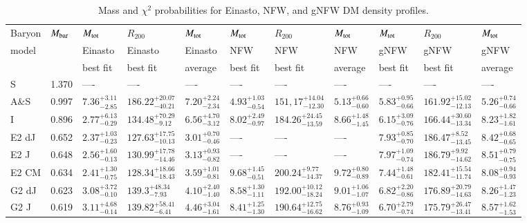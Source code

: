 \documentclass{aa}
\begin{document}
\begin{table*}
        \centering
        \caption{Mass and $\chi^2$ probabilities for Einasto, NFW, and gNFW DM density profiles.}
        \label{tab:estimated_mass}
\begin{tabular}{lllllllllll}
\hline\hline
Baryon  & $M_{\rm bar}$ & $M_{\rm tot}$ & $R_{200}$  &  $M_{\rm tot}$ & $M_{\rm tot}$ & $R_{200}$ & $M_{\rm tot}$ & $M_{\rm tot}$  & $R_{200}$ & $M_{\rm tot}$ \\
model &  &  Einasto & Einasto &  Einasto & NFW & NFW & NFW & gNFW & gNFW & gNFW  \\
 & & best fit & best fit & average & best fit & best fit & average & best fit & best fit & average \\
\hline
S & 1.370 & ---- & ---- & ---- & ---- & ---- & ---- & ---- & ---- & ---- \\
A\&S & 0.997 & $ 7.36^{+3.11}_{-2.85}$ & $186.22^{+20.07}_{-40.21}$ & $ 7.20^{+2.24}_{-2.34}$ & $4.93^{+1.03}_{-0.54}$ & $151,17^{+14.04}_{-12.30}$ & $5.13^{+0.66}_{-0.60}$ & $5.83^{+0.95}_{-0.66}$ & $161.92^{+15.02}_{-12.13}$ & $5.26^{+0.74}_{-0.66}$\\
I & 0.896 & $2.77^{+6.13}_{-0.29}$ & $134.48^{+70.29}_{-9.12}$ & $6.56^{+4.70}_{-3.12}$ & $8.02^{+2.49}_{-0.97}$ & $184.26^{+24.45}_{-13.59}$ & $8.66^{+1.48}_{-1.45}$ & $6.15^{+3.09}_{-0.76}$ & $166.44^{+30.60}_{-13.34}$ & $8.23^{+1.82}_{-1.61}$\\
E2 dJ & 0.652 & $2.37^{+1.03}_{-0.23}$ & $127.63^{+17.75}_{-10.13}$ & $3.01^{+0.70}_{-0.46}$ & ---- & ---- &---- & $7.93^{+0.85}_{-0.70}$ & $186.47^{+8.52}_{-13.45}$ & $8.42^{+0.68}_{-0.65}$\\
E2 J & 0.648 & $2.56^{+1.60}_{-0.13}$ & $130.99^{+17.78}_{-14.46}$ & $3.13^{+0.93}_{-0.82}$ & ---- & ---- & ---- & $7.97^{+1.09}_{-0.74}$ & $186.79^{+9.92}_{-14.62}$ & $8.51^{+0.79}_{-0.75}$\\
E2 CM & 0.634 & $2.41^{+1.30}_{-0.75}$ & $128.34^{+18.66}_{-18.43}$ & $3.59^{+1.01}_{-0.81}$  & $9.68^{+1.45}_{-0.51}$ & $200.24^{+9.77}_{-14.37}$ & $9.72^{+0.80}_{-0.89}$& $7.44^{+1.48}_{-0.61}$ & $182.41^{+15.54}_{-11.74}$ & $8.08^{+0.94}_{-0.93}$\\
G2 dJ & 0.623 & $3.08^{+3.72}_{-0.10}$ & $139.3^{+48.34}_{-7.93}$ & $4.10^{+2.40}_{-1.40}$ & $8.58^{+1.30}_{-1.11}$ & $192.00^{+10.12}_{-18.24}$ & $9.01^{+1.06}_{-1.07}$ & $6.82^{+2.20}_{-0.86}$ & $176.89^{+20.79}_{-14.63}$ & $8.26^{+1.47}_{-1.23}$\\
G2 J & 0.619 & $3.11^{+4.68}_{-0.14}$ & $139.82^{+58.41}_{-6.41}$ & $4.46^{+3.04}_{-1.61}$ & $8.41^{+1.25}_{-1.30}$ & $190.64^{+12.75}_{-16.62}$ & $8.76^{+0.93}_{-1.09}$ & $6.70^{+2.79}_{-0.74}$ & $175.79^{+26.47}_{-13.41}$ & $8.57^{+1.62}_{-1.53}$\\

\end{tabular}
\end{table*}
\end{document}
